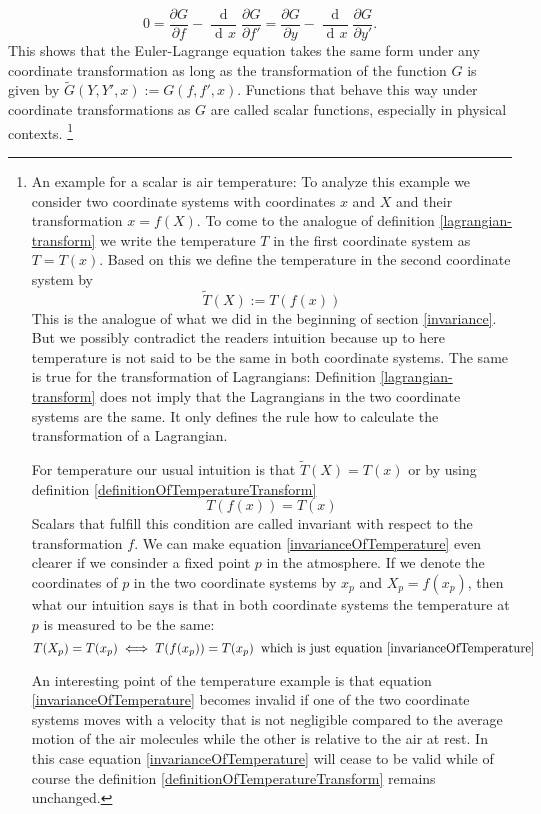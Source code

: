 \documentclass[prb,preprint]{revtex4-1}
\DeclareMathOperator{\dd}{d\!}
\DeclareMathOperator{\ddd}{\mathrm{d}}
\begin{document}
\begin{equation}
0 = \frac{\partial G}{\partial f} - \frac{\ddd}{\dd x} \frac{\partial G}{\partial f'}
= \frac{\partial G}{\partial y} - \frac{\ddd}{\dd x} \frac{\partial G}{\partial y'}.
\end{equation}
This shows that the Euler-Lagrange equation takes the same form under any coordinate transformation as long as the transformation of the function $G$ is given by $\widetilde{G}(Y,Y',x) := G(f,f',x)$. Functions that behave this way under coordinate transformations as $G$ are called scalar functions, especially in physical contexts.
\footnote{An example for a scalar is air temperature:
To analyze this example we consider two coordinate systems with coordinates $x$ and $X$ and their transformation $x=f(X)$.
To come to the analogue of definition \ref{lagrangian-transform} we write the temperature $T$ in the first coordinate system as $T=T(x)$.
Based on this we define the temperature in the second coordinate system by
\begin{equation} \label{definitionOfTemperatureTransform}
  \tilde{T}(X) := T(f(x))
\end{equation}
This is the analogue of what we did in the beginning of section \ref{invariance}.
But we possibly contradict the readers intuition because up to here temperature is not said to be the same in both coordinate systems.
The same is true for the transformation of Lagrangians: Definition \ref{lagrangian-transform} does not imply that the Lagrangians in the two coordinate systems are the same.
It only defines the rule how to calculate the transformation of a Lagrangian.

For temperature our usual intuition is that $\tilde{T}(X) = T(x)$ or by using definition \ref{definitionOfTemperatureTransform}
\begin{equation} \label{invarianceOfTemperature}
  T(f(x)) = T(x)
\end{equation}
Scalars that fulfill this condition are called invariant with respect to the transformation $f$.
We can make equation \ref{invarianceOfTemperature} even clearer if we consinder a fixed point $p$ in the atmosphere.
If we denote the coordinates of $p$ in the two coordinate systems by $x_p$ and $X_p=f(x_p)$,
then what our intuition says is that in both coordinate systems the temperature at $p$ is measured to be the same:
\begin{equation}
  T(X_p)=T(x_p) \iff T(f(x_p))=T(x_p) \;\; \text{which is just equation \ref{invarianceOfTemperature}}
\end{equation}

An interesting point of the temperature example is that equation \ref{invarianceOfTemperature} becomes invalid if one of the two coordinate systems moves with a velocity that is not negligible compared to the average motion of the air molecules while the other is relative to the air at rest.
In this case equation \ref{invarianceOfTemperature} will cease to be valid while of course the definition \ref{definitionOfTemperatureTransform} remains unchanged.
}
\end{document}
